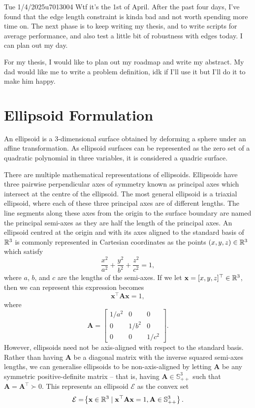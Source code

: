 \documentclass{project-logbook}
\begin{document}
	\begin{MeetingMinutes}{Tue 1/4/2025}{u7013004}
		Wtf it's the 1st of April. After the past four days, I've found that the edge length constraint is kinda bad and not worth spending more time on. 
		The next phase is to keep writing my thesis, and to write scripts for average performance, and also test a little bit of robustness with edges today. I can plan out my day. 

		For my thesis, I would like to plan out my roadmap and write my abstract. My dad would like me to write a problem definition, idk if I'll use it but I'll do it to make him happy. 
	\end{MeetingMinutes}

\section{Ellipsoid Formulation} \label{sec:ellipsoid}
An ellipsoid is a 3-dimensional surface obtained by deforming a sphere under an affine transformation. As ellipsoid surfaces can be represented as the zero set of a quadratic polynomial in three variables, it is considered a quadric surface.

There are multiple mathematical representations of ellipsoids. Ellipsoids have three pairwise perpendicular axes of symmetry known as principal axes which intersect at the centre of the ellipsoid. The most general ellipsoid is a triaxial ellipsoid, where each of these three principal axes are of different lengths. The line segments along these axes from the origin to the surface boundary are named the principal semi-axes as they are half the length of the principal axes. An ellipsoid centred at the origin and with its axes aligned to the standard basis of $\mathbb{R}^3$ is commonly represented in Cartesian coordinates as the points $(x,y,z) \in \mathbb{R}^3$ which satisfy
\begin{equation}
	\frac{x^2}{a^2} + \frac{y^2}{b^2} + \frac{z^2}{c^2} = 1,
\end{equation}
where $a$, $b$, and $c$ are the lengths of the semi-axes. If we let $\mathbf x = [x, y, z]^\top \in \mathbb{R}^3$, then we can represent this expression becomes
\begin{equation}
	\mathbf x^\top \mathbf A \mathbf x = 1,
\end{equation}
where $$\mathbf A = \begin{bmatrix}
	1/a^2 & 0 & 0 \\
	0 & 1/b^2 & 0 \\
	0 & 0 & 1/c^2
\end{bmatrix}.$$
However, ellipsoids need not be axis-aligned with respect to the standard basis. Rather than having $\mathbf A$ be a diagonal matrix with the inverse squared semi-axes lengths, we can generalise ellipsoids to be non-axis-aligned by letting $\mathbf A$ be any symmetric positive-definite matrix -- that is, having $\mathbf A \in \mathbb S^3_{++}$ such that $\mathbf A = \mathbf A^\top \succ 0$. This represents an ellipsoid $\mathcal E$ as the convex set
\begin{equation}
	\mathcal E  = \!\left\{ \mathbf x \in \mathbb{R}^3 \mid \mathbf x^\top \mathbf A \mathbf x = 1, \mathbf A \in \mathbb S^3_{++}  \right\}.
\end{equation}
\end{document}
